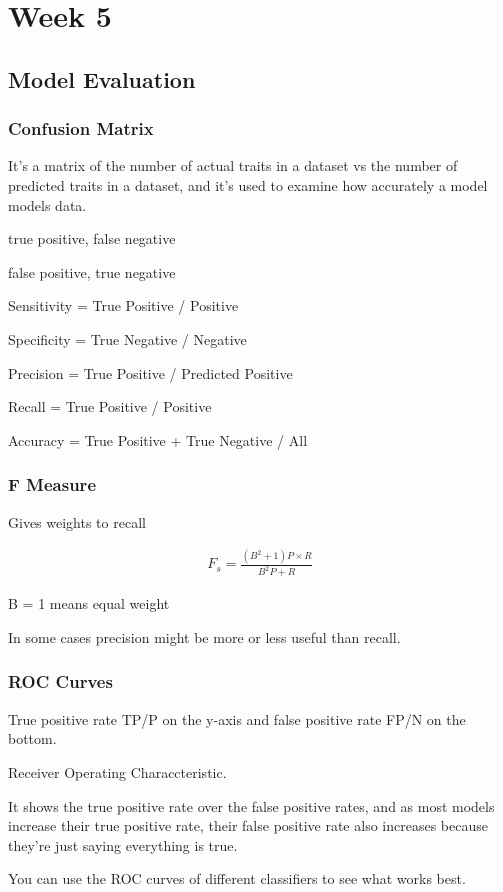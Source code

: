 \documentclass[fleqn]{report}
\newcommand{\equations} [1] {
\begin{gather*}
#1
\end{gather*}
}
\begin{document}
\chapter{Week 5}
\section{Model Evaluation}

\subsection{Confusion Matrix}
It's a matrix of the number of actual traits in a dataset vs the number 
of predicted traits in a dataset, and it's used to examine how accurately a model 
models data. 

true positive, false negative 

false positive, true negative 

Sensitivity = True Positive / Positive 

Specificity = True Negative / Negative 

Precision = True Positive / Predicted Positive 

Recall = True Positive / Positive 

Accuracy = True Positive + True Negative / All

\subsection{F Measure}
Gives weights to recall 

\equations{
    F_s 
    =
    \frac{(B^2 + 1)P \times R}{B^2 P + R}
}
B = 1 means equal weight 

In some cases precision might be more or less useful than recall.

\subsection{ROC Curves}
True positive rate TP/P on the y-axis and false positive rate FP/N on the bottom.

Receiver Operating Characcteristic. 

It shows the true positive rate over the false positive rates, and as most 
models increase their true positive rate, their false positive rate also increases
because they're just saying everything is true. 

You can use the ROC curves of different classifiers to see what works 
best. 
\end{document}

